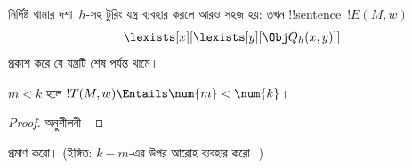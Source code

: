 \documentclass[../../../include/open-logic-section]{subfiles}
\begin{document}
নির্দিষ্ট থামার দশা~$h$-সহ টুরিং যন্ত্র ব্যবহার করলে আরও সহজ হয়: তখন
!!{sentence}~$!E(M,w)$
\[
\lexists[x][\lexists[y][\Obj Q_h(x, y)]]
\]
প্রকাশ করে যে যন্ত্রটি শেষ পর্যন্ত থামে।

\begin{prop}
$m<k$ হলে $!T(M,w) \Entails \num{m}<\num{k}$।
\end{prop}

\begin{proof}
অনুশীলনী।
\end{proof}

\begin{prob}
 প্রমাণ করো।
(ইঙ্গিত: $k-m$-এর উপর আরোহ ব্যবহার করো।)
\end{prob}
\end{document}
